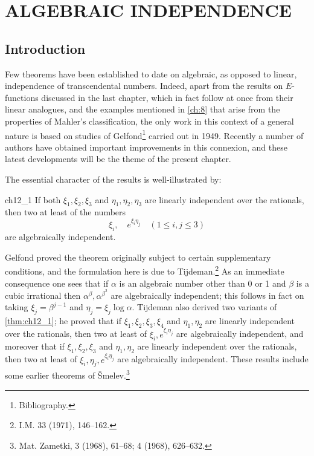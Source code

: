 
\chapter{ALGEBRAIC INDEPENDENCE}\label{ch:12}

\section{Introduction}

Few theorems have been established to date on algebraic, as opposed to linear, independence of transcendental numbers. Indeed, apart from the results on $E$-functions discussed in the last chapter, which in fact follow at once from their linear analogues, and the examples mentioned in \autoref{ch:8} that arise from the properties of Mahler's classification, the only work in this context of a general nature is based on studies of Gelfond\footnote{Bibliography.} carried out in 1949. Recently a number of authors have obtained important improvements in this connexion, and these latest developments will be the theme of the present chapter.

The essential character of the results is well-illustrated by:

\begin{mythm}{}{ch12_1}
If both $\xi_1, \xi_2, \xi_3$ and $\eta_1, \eta_2, \eta_3$ are linearly independent over the rationals, then two at least of the numbers
\[\xi_i, \quad e^{\xi_i \eta_j} \quad (1 \leq i, j \leq 3)\]
are algebraically independent.
\end{mythm}

Gelfond proved the theorem originally subject to certain supplementary conditions, and the formulation here is due to Tijdeman.\footnote{I.M. 33 (1971), 146--162.} As an immediate consequence one sees that if $\alpha$ is an algebraic number other than 0 or 1 and $\beta$ is a cubic irrational then $\alpha^{\beta}, \alpha^{\beta^2}$ are algebraically independent; this follows in fact on taking $\xi_j = \beta^{j-1}$ and $\eta_j = \xi_j \log \alpha$. Tijdeman also derived two variants of \autoref{thm:ch12_1}; he proved that if $\xi_1, \xi_2, \xi_3, \xi_4$ and $\eta_1, \eta_2$ are linearly independent over the rationals, then two at least of $\xi_i, e^{\xi_i \eta_j}$ are algebraically independent, and moreover that if $\xi_1, \xi_2, \xi_3$ and $\eta_1, \eta_2$ are linearly independent over the rationals, then two at least of $\xi_i, \eta_j, e^{\xi_i \eta_j}$ are algebraically independent. These results include some earlier theorems of \v{S}melev.\footnote{Mat. Zametki, 3 (1968), 61--68; 4 (1968), 626--632.}

